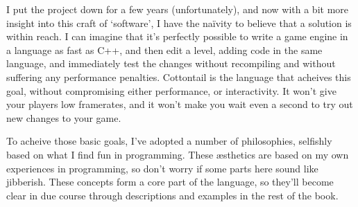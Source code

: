 I put the project down for a few years (unfortunately), and now with a
bit more insight into this craft of `software', I have the naïvity to
believe that a solution is within reach. I can imagine that it's
perfectly possible to write a game engine in a language as fast as
C++, and then edit a level, adding code in the same language, and
immediately test the changes without recompiling and without suffering
any performance penalties. Cottontail is the language that acheives
this goal, without compromising either performance, or interactivity.
It won't give your players low framerates, and it won't make you wait
even a second to try out new changes to your game.

To acheive those basic goals, I've adopted a number of philosophies,
selfishly based on what I find fun in programming. These æsthetics are
based on my own experiences in programming, so don't worry if some
parts here sound like jibberish. These concepts form a core part of
the language, so they'll become clear in due course through
descriptions and examples in the rest of the book.

